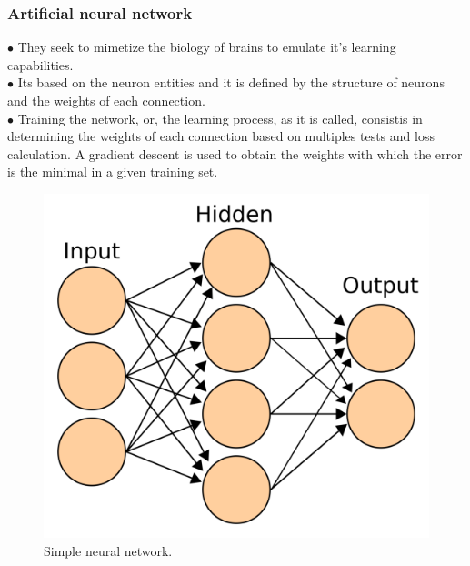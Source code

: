 \documentclass[xcolor=dvipsnames,10pt,aspectratio=169]{beamer}
\begin{document}
\begin{frame}\frametitle{Artificial neural network}
	\begin{minipage}[h!]{0.39\textwidth}
		$\bullet$ They seek to mimetize the biology of brains to emulate it's learning capabilities.\\
		$\bullet$ Its based on the neuron entities and it is defined by the structure of neurons and the weights of each connection.\\
		$\bullet$ Training the network, or, the learning process, as it is called, consistis in determining the weights of each connection based on multiples tests and loss calculation. A gradient descent is used to obtain the weights with which the error is the minimal in a given training set.
	\end{minipage}
	\begin{minipage}[h!]{0.6\textwidth}
		\begin{figure}[h!]
			\centering
			\includegraphics[trim = {0cm 0cm 0cm 0cm}, clip , angle=0, scale=0.18]{./my_images/neural_figure.png}
			\caption{Simple neural network.}
		\end{figure}
	\end{minipage}
\end{frame}
\end{document}
